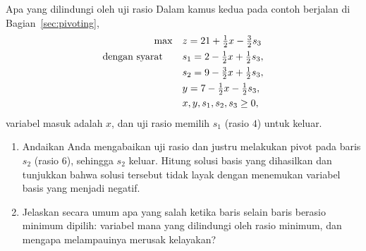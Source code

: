 \begin{ex}{Apa yang dilindungi oleh uji rasio}{}
\label{ex:ratio-test-wrong-row}
 Dalam kamus kedua pada contoh berjalan di Bagian~\ref{sec:pivoting},
\[
\begin{aligned}
\max\quad & z = 21 + \tfrac12 x - \tfrac32 s_3 \\
\mbox{dengan syarat}\quad\quad & s_1 = 2 - \tfrac12 x + \tfrac12 s_3, \\
& s_2 = 9 - \tfrac32 x + \tfrac12 s_3, \\
& y = 7 - \tfrac12 x - \tfrac12 s_3, \\
& x, y, s_1, s_2, s_3 \geq 0,
\end{aligned}
\]
variabel masuk adalah $x$, dan uji rasio memilih $s_1$ (rasio $4$) untuk keluar.
\begin{enumerate}
    \item Andaikan Anda mengabaikan uji rasio dan justru melakukan pivot pada baris $s_2$ (rasio $6$), sehingga $s_2$ keluar. Hitung solusi basis yang dihasilkan dan tunjukkan bahwa solusi tersebut tidak layak dengan menemukan variabel basis yang menjadi negatif.
    \item Jelaskan secara umum apa yang salah ketika baris selain baris berasio minimum dipilih: variabel mana yang dilindungi oleh rasio minimum, dan mengapa melampauinya merusak kelayakan?
\end{enumerate}
\end{ex}


